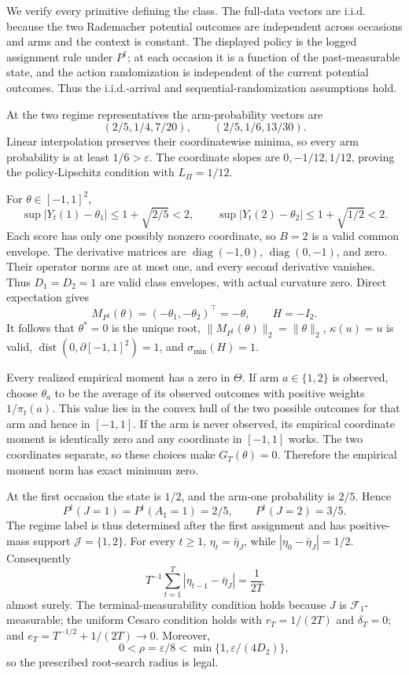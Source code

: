 We verify every primitive defining the class. The full-data vectors are i.i.d. because the two Rademacher potential outcomes are independent across occasions and arms and the context is constant. The displayed policy is the logged assignment rule under \(P^{\dagger}\); at each occasion it is a function of the past-measurable state, and the action randomization is independent of the current potential outcomes. Thus the i.i.d.-arrival and sequential-randomization assumptions hold.

At the two regime representatives the arm-probability vectors are
\[
 (2/5,1/4,7/20),
 \qquad (2/5,1/6,13/30). \tag{1}
\]
Linear interpolation preserves their coordinatewise minima, so every arm probability is at least \(1/6>\varepsilon\). The coordinate slopes are \(0,-1/12,1/12\), proving the policy-Lipschitz condition with \(L_\Pi=1/12\).

For \(\theta\in[-1,1]^2\),
\[
 \sup|Y_t(1)-\theta_1|\le1+\sqrt{2/5}<2,
 \qquad
 \sup|Y_t(2)-\theta_2|\le1+\sqrt{1/2}<2. \tag{2}
\]
Each score has only one possibly nonzero coordinate, so \(B=2\) is a valid common envelope. The derivative matrices are \(\operatorname{diag}(-1,0)\), \(\operatorname{diag}(0,-1)\), and zero. Their operator norms are at most one, and every second derivative vanishes. Thus \(D_1=D_2=1\) are valid class envelopes, with actual curvature zero. Direct expectation gives
\[
 M_{P^{\dagger}}(\theta)=(-\theta_1,-\theta_2)^\top=-\theta,
 \qquad H=-I_2. \tag{3}
\]
It follows that \(\theta^*=0\) is the unique root, \(\|M_{P^{\dagger}}(\theta)\|_2=\|\theta\|_2\), \(\kappa(u)=u\) is valid, \(\operatorname{dist}(0,\partial[-1,1]^2)=1\), and \(\sigma_{\min}(H)=1\).

Every realized empirical moment has a zero in \(\Theta\). If arm \(a\in\{1,2\}\) is observed, choose \(\theta_a\) to be the average of its observed outcomes with positive weights \(1/\pi_t(a)\). This value lies in the convex hull of the two possible outcomes for that arm and hence in \([-1,1]\). If the arm is never observed, its empirical coordinate moment is identically zero and any coordinate in \([-1,1]\) works. The two coordinates separate, so these choices make \(G_T(\theta)=0\). Therefore the empirical moment norm has exact minimum zero.

At the first occasion the state is \(1/2\), and the arm-one probability is \(2/5\). Hence
\[
 P^{\dagger}(J=1)=P^{\dagger}(A_1=1)=2/5,
 \qquad P^{\dagger}(J=2)=3/5. \tag{4}
\]
The regime label is thus determined after the first assignment and has positive-mass support \(\mathcal J=\{1,2\}\). For every \(t\ge1\), \(\eta_t=\bar\eta_J\), while \(|\eta_0-\bar\eta_J|=1/2\). Consequently
\[
 T^{-1}\sum_{t=1}^T|\eta_{t-1}-\bar\eta_J|=\frac1{2T} \tag{5}
\]
almost surely. The terminal-measurability condition holds because \(J\) is \(\mathcal F_1\)-measurable; the uniform Cesaro condition holds with \(r_T=1/(2T)\) and \(\delta_T=0\); and \(e_T=T^{-1/2}+1/(2T)\to0\). Moreover,
\[
 0<\rho=\varepsilon/8<\min\{1,\varepsilon/(4D_2)\}, \tag{6}
\]
so the prescribed root-search radius is legal.

